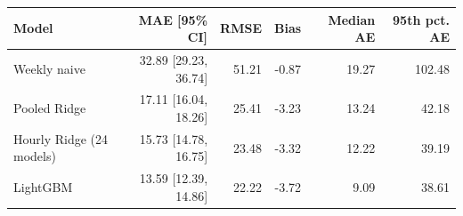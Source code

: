 \begin{tabular}{lrrrrr}
\toprule
Model & MAE [95\% CI] & RMSE & Bias & Median AE & 95th pct. AE \\
\midrule
Weekly naive & 32.89 [29.23, 36.74] & 51.21 & -0.87 & 19.27 & 102.48 \\
Pooled Ridge & 17.11 [16.04, 18.26] & 25.41 & -3.23 & 13.24 & 42.18 \\
Hourly Ridge (24 models) & 15.73 [14.78, 16.75] & 23.48 & -3.32 & 12.22 & 39.19 \\
LightGBM & 13.59 [12.39, 14.86] & 22.22 & -3.72 & 9.09 & 38.61 \\
\bottomrule
\end{tabular}
